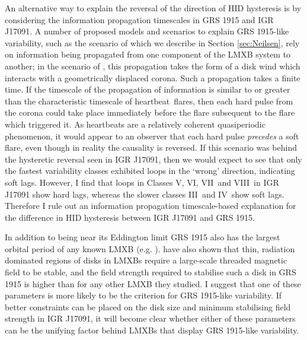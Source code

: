 \par An alternative way to explain the reversal of the direction of HID hysteresis is by considering the information propagation timescales in GRS 1915 and IGR J17091.  A number of proposed models and scenarios to explain GRS 1915-like variability, such as the scenario of \citet{Neilsen_GRSModel} which we describe in Section \ref{sec:Neilsen}, rely on information being propagated from one component of the LMXB system to another; in the scenario of \citeauthor{Neilsen_GRSModel}, this propagation takes the form of a disk wind which interacts with a geometrically displaced corona.  Such a propagation takes a finite time.  If the timescale of the propagation of information is similar to or greater than the characteristic timescale of heartbeat\indexrho\ flares, then each hard pulse from the corona could take place immediately before the flare subsequent to the flare which triggered it.  As heartbeats are a relatively coherent quasiperiodic phenomenon, it would appear to an observer that each hard pulse \textit{precedes} a soft flare, even though in reality the causality is reversed.  If this scenario was behind the hysteretic reversal seen in IGR J17091, then we would expect to see that only the fastest variability classes exhibited loops in the `wrong' direction, indicating soft lags.  However, I find that loops in Classes V\indexv, VI\indexvi, VII\indexvii\ and VIII\indexviii\ in IGR J17091 show hard lags, whereas the slower classes III\indexiii\ and IV\indexiv\ show soft lags.  Therefore I rule out an information propagation timescale-based explanation for the difference in HID hysteresis between IGR J17091 and GRS 1915.
\par In addition to being near its Eddington limit GRS 1915 also has the largest orbital period of any known LMXB (e.g. \citealp{McClintock_BHBs}).  \citealp{Sadowski_MagField} have also shown that thin, radiation dominated regions of disks in LMXBs require a large-scale threaded magnetic field to be stable, and the field strength required to stabilise such a disk in GRS 1915 is higher than for any other LMXB they studied.  I suggest that one of these parameters is more likely to be the criterion for GRS 1915-like variability.  If better constraints can be placed on the disk size and minimum stabilising field strength in IGR J17091, it will become clear whether either of these parameters can be the unifying factor behind LMXBs that display GRS 1915-like variability.

